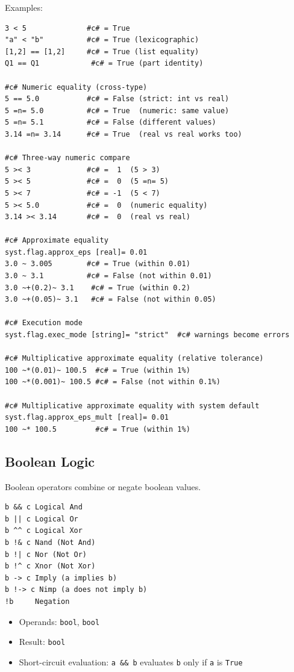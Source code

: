 \documentclass{report}
\begin{document}
Examples:
\begin{verbatim}
3 < 5              #c# = True
"a" < "b"          #c# = True (lexicographic)
[1,2] == [1,2]     #c# = True (list equality)
Q1 == Q1            #c# = True (part identity)

#c# Numeric equality (cross-type)
5 == 5.0           #c# = False (strict: int vs real)
5 =n= 5.0          #c# = True  (numeric: same value)
5 =n= 5.1          #c# = False (different values)
3.14 =n= 3.14      #c# = True  (real vs real works too)

#c# Three-way numeric compare
5 >< 3             #c# =  1  (5 > 3)
5 >< 5             #c# =  0  (5 =n= 5)
5 >< 7             #c# = -1  (5 < 7)
5 >< 5.0           #c# =  0  (numeric equality)
3.14 >< 3.14       #c# =  0  (real vs real)

#c# Approximate equality
syst.flag.approx_eps [real]= 0.01
3.0 ~ 3.005        #c# = True (within 0.01)
3.0 ~ 3.1          #c# = False (not within 0.01)
3.0 ~+(0.2)~ 3.1    #c# = True (within 0.2)
3.0 ~+(0.05)~ 3.1   #c# = False (not within 0.05)

#c# Execution mode
syst.flag.exec_mode [string]= "strict"  #c# warnings become errors

#c# Multiplicative approximate equality (relative tolerance)
100 ~*(0.01)~ 100.5  #c# = True (within 1%)
100 ~*(0.001)~ 100.5 #c# = False (not within 0.1%)

#c# Multiplicative approximate equality with system default
syst.flag.approx_eps_mult [real]= 0.01
100 ~* 100.5         #c# = True (within 1%)
\end{verbatim}

\subsection{Boolean Logic}
Boolean operators combine or negate boolean values.
\begin{verbatim}
b && c Logical And
b || c Logical Or
b ^^ c Logical Xor
b !& c Nand (Not And)
b !| c Nor (Not Or)
b !^ c Xnor (Not Xor)
b -> c Imply (a implies b)
b !-> c Nimp (a does not imply b)
!b     Negation
\end{verbatim}

\begin{itemize}
\item Operands: \texttt{bool}, \texttt{bool}
\item Result: \texttt{bool}
\item Short-circuit evaluation: \texttt{a \&\& b} evaluates \texttt{b} only if \texttt{a} is \texttt{True}
\end{itemize}
\end{document}
